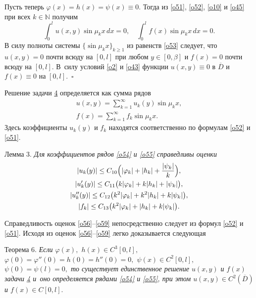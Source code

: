 Пусть теперь $\varphi(x)=h(x)=\psi(x)\equiv0$. Тогда из \eqref{o51}, \eqref{o52}, \eqref{o10} и \eqref{o45} при всех $k\in\mathbb{N}$ получим
\begin{equation}
\label{o53}
\int _{0}^{l}u(x,y)\sin\mu_kx\,dx=0,\quad  
\int _{0}^{l}f(x)\sin\mu_kx\,dx=0.
\end{equation}
В силу полноты системы $\{\sin\mu_kx\}_{k\geq1}$ из равенств \eqref{o53} следует, что ${u(x,y)=0}$ почти всюду на $[0,l]$ при любом $y\in[0,\beta]$ и $f(x)=0$ почти всюду на $[0,l]$. 
В~силу условий \eqref{o2} и \eqref{o43} функции $u(x,y)\equiv0$ в $\overline{D}$ и $f(x)\equiv0$ на $[0,l]$.~$\square$

\smallskip



Решение задачи \hyperlink{sab:task4}{4} определяется как сумма рядов
\begin{gather}\label{o54}
u(x,y)=\sum\limits_{k=1}^{\infty}u_k(y)\sin\mu_kx,
\\
\label{o55}
f(x)=\sum\limits_{k=1}^{\infty}f_k\sin\mu_kx.
\end{gather}
Здесь коэффициенты $u_k(y)$ и $f_k$ находятся соответственно по формулам \eqref{o52} и \eqref{o51}.

\smallskip

\hypertarget{sab:lemma3}{}

{\small \sc Лемма 3.} \textit{Для коэффициентов рядов {\em \eqref{o54}} и {\em \eqref{o55}} справедливы оценки}
\begin{gather}
\label{o56}
|u_k(y)|\leq C_{10}\Bigl(|\varphi_k|+|h_k|+\frac{|\psi_k|}{k}\Bigr),
\\
\label{o59}
|u'_k(y)|\leq C_{11}\bigl(k|\varphi_k|+k|h_k|+|\psi_k|\bigr),
\\
\label{o59}
|u''_k(y)|\leq C_{12}\bigl(k^2|\varphi_k|+k^2|h_k|+k|\psi_k|\bigr),
\\
\label{o59}
|f_k|\leq C_{13}\bigl(k^2|\varphi_k|+|h_k|+k|\psi_k|\bigr).
\end{gather}

\smallskip

Справедливость оценок \eqref{o56}--\eqref{o59} непосредственно следует из формул \eqref{o52} и \eqref{o51}.
Исходя из оценок \eqref{o56}--\eqref{o59} легко доказывается следующая

\smallskip
\hypertarget{sab:th6}{}

{\small\sc Теорема 6.} \textit{Если $\varphi(x),$ $ h(x) \in  C^3[0,l],$ $\varphi(0)=\varphi''(0)=h(0)={h''(0)=0,}$ $\psi(x)\in C^2[0,l],$ $\psi(0)=\psi(l)=0,$ то существует единственное решение $u(x,y)$ и $f(x)$ задачи {\em \hyperlink{sab:task4}{4}} и~оно определяется рядами {\em \eqref{o54}} и {\em \eqref{o55},} при этом $u(x,y)\in C^2(\overline{D})$ и $f(x)\in C[0,l]$}.

